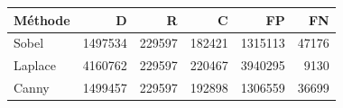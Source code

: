 \begin{tabular}{lrrrrr}
\toprule
Méthode & D & R & C & FP & FN\\
\midrule
Sobel & 1497534 & 229597 & 182421 & 1315113 & 47176\\
Laplace & 4160762 & 229597 & 220467 & 3940295 & 9130\\
Canny & 1499457 & 229597 & 192898 & 1306559 & 36699\\
\bottomrule
\end{tabular}
